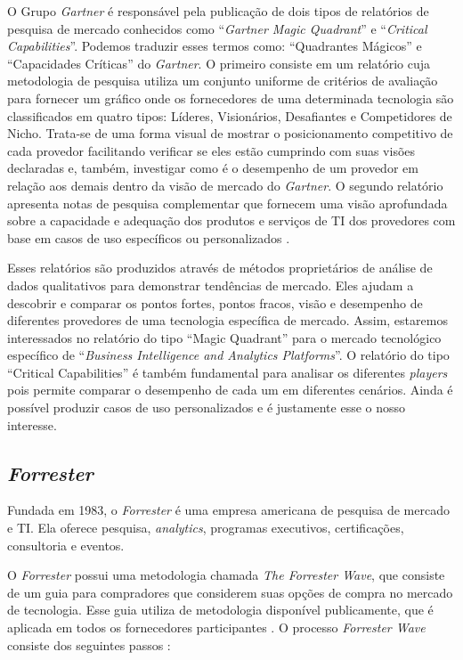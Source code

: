 O Grupo \emph{Gartner} é responsável pela publicação de dois tipos de relatórios de pesquisa de mercado conhecidos como ``\emph{Gartner Magic Quadrant}'' e ``\emph{Critical Capabilities}''. Podemos traduzir esses termos como: ``Quadrantes Mágicos'' e ``Capacidades Críticas'' do \emph{Gartner}. 
O primeiro consiste em um relatório cuja metodologia de pesquisa utiliza um conjunto uniforme de critérios de avaliação para fornecer um gráfico onde os fornecedores de uma determinada tecnologia são classificados em quatro tipos: Líderes, Visionários, Desafiantes e Competidores de Nicho. Trata-se de uma forma visual de  mostrar o posicionamento competitivo de cada 
provedor facilitando verificar se eles estão cumprindo com suas visões declaradas e, também, investigar como é o desempenho de um provedor em relação aos demais dentro da visão de mercado do \emph{Gartner}.
O segundo relatório apresenta notas de pesquisa complementar que fornecem uma visão aprofundada sobre a capacidade e adequação dos produtos e serviços de TI dos provedores com base em casos de uso específicos ou personalizados \cite{gartner:magicquadrantsecriticalcapabilities}. 

Esses relatórios são produzidos através de métodos proprietários de análise de dados qualitativos para demonstrar tendências de mercado. Eles ajudam a descobrir e comparar os pontos fortes, pontos fracos, visão e desempenho de diferentes provedores de uma tecnologia específica de mercado. Assim, estaremos interessados no relatório do tipo ``Magic Quadrant'' para o mercado tecnológico específico de ``\emph{Business Intelligence and Analytics Platforms}''. O relatório do tipo ``Critical Capabilities'' é também fundamental para analisar os diferentes \emph{players} pois permite comparar o desempenho de cada um em diferentes cenários. Ainda é possível produzir casos de uso personalizados e é justamente esse o nosso interesse.

\subsection{\emph{Forrester}}

Fundada em 1983, o \emph{Forrester} é uma empresa americana de pesquisa de mercado e TI. Ela oferece pesquisa, \emph{analytics}, programas executivos, certificações, consultoria e eventos.

O \emph{Forrester} possui uma metodologia chamada \emph{The Forrester Wave}, que consiste de um guia para compradores que considerem suas opções de compra no mercado de tecnologia. Esse guia utiliza de metodologia disponível publicamente, que é aplicada em todos os fornecedores participantes \cite{forrester:waveMethodology}. O processo \emph{Forrester Wave} consiste dos seguintes passos \cite{forrester:waveMethodology}:


